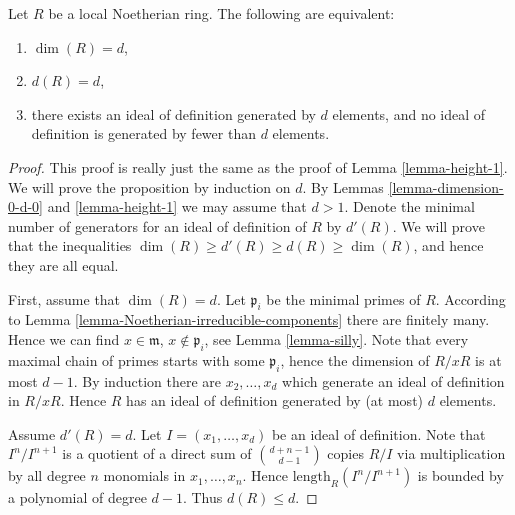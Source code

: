 \begin{proposition}
\label{proposition-dimension}
Let $R$ be a local Noetherian ring.
The following are equivalent:
\begin{enumerate}
\item $\dim(R) = d$,
\label{item-dim-d}
\item $d(R) = d$,
\label{item-d-d}
\item there exists an ideal of definition generated by $d$ elements,
and no ideal of definition is generated by fewer than $d$ elements.
\label{item-ideal-d}
\end{enumerate}
\end{proposition}

\begin{proof}
This proof is really just the same as the proof of Lemma
\ref{lemma-height-1}. We will prove the proposition by induction
on $d$. By Lemmas \ref{lemma-dimension-0-d-0} and \ref{lemma-height-1}
we may assume that $d > 1$. Denote the minimal number of
generators for an ideal of definition of $R$ by $d'(R)$.
We will prove that the inequalities
$\dim(R) \geq d'(R) \geq d(R) \geq \dim(R)$,
and hence they are all equal.

\medskip\noindent
First, assume that $\dim(R) = d$.
Let $\mathfrak p_i$ be the minimal primes of $R$.
According to Lemma \ref{lemma-Noetherian-irreducible-components}
there are finitely many. Hence we can find $x \in \mathfrak m$,
$x \not \in \mathfrak p_i$, see Lemma \ref{lemma-silly}.
Note that every maximal chain of primes starts with some $\mathfrak p_i$,
hence the dimension of $R/xR$ is at most $d-1$. By induction
there are $x_2, \ldots, x_d$ which generate an ideal of definition
in $R/xR$. Hence $R$ has an ideal of definition generated
by (at most) $d$ elements.

\medskip\noindent
Assume $d'(R) = d$. Let $I = (x_1, \ldots, x_d)$ be an ideal
of definition. Note that $I^n/I^{n + 1}$ is a quotient of a direct
sum of $\binom{d + n - 1}{d - 1}$ copies $R/I$ via multiplication
by all degree $n$ monomials in $x_1, \ldots, x_n$.
Hence $\text{length}_R(I^n/I^{n + 1})$ is bounded by a polynomial
of degree $d-1$. Thus $d(R) \leq d$.


\end{proof}
